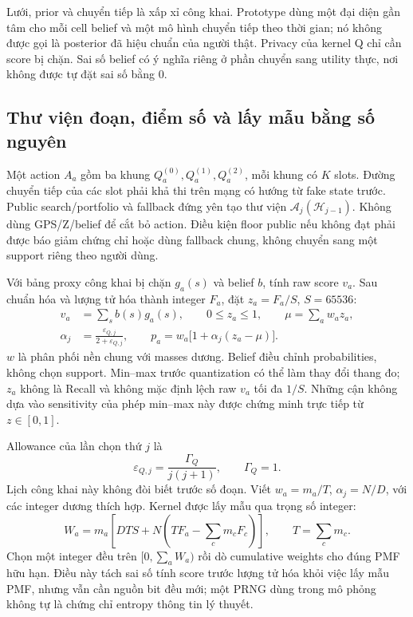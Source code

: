 Lưới, prior và chuyển tiếp là xấp xỉ công khai. Prototype dùng một đại diện gần tâm cho mỗi cell
belief và một mô hình chuyển tiếp theo thời gian; nó không được gọi là posterior đã hiệu chuẩn của
người thật. Privacy của kernel Q chỉ cần score bị chặn. Sai số belief có ý nghĩa riêng ở phần chuyển
sang utility thực, nơi không được tự đặt sai số bằng 0.

\subsection{Thư viện đoạn, điểm số và lấy mẫu bằng số nguyên}
Một action $A_a$ gồm ba khung $Q_a^{(0)},Q_a^{(1)},Q_a^{(2)}$, mỗi khung có $K$ slots. Đường chuyển
tiếp của các slot phải khả thi trên mạng có hướng từ fake state trước. Public search/portfolio và
fallback đứng yên tạo thư viện $\mathcal A_j(\mathcal H_{j-1})$. Không dùng GPS/Z/belief để cắt bỏ
action. Điều kiện floor public nếu không đạt phải được báo giảm chứng chỉ hoặc dùng fallback chung,
không chuyển sang một support riêng theo người dùng.

Với bảng proxy công khai bị chặn $g_a(s)$ và belief $b$, tính raw score $v_a$. Sau chuẩn hóa và
lượng tử hóa thành integer $F_a$, đặt $z_a=F_a/S$, $S=65536$:
\begin{align}
v_a&=\sum_s b(s)g_a(s),\qquad 0\le z_a\le1,\qquad \mu=\sum_a w_a z_a,\nonumber\\
\alpha_j&=\frac{\varepsilon_{Q,j}}{2+\varepsilon_{Q,j}},\qquad
p_a=w_a\bigl[1+\alpha_j(z_a-\mu)\bigr].\label{eq:kernel}
\end{align}
$w$ là phân phối nền chung với masses dương. Belief điều chỉnh probabilities, không chọn support.
Min--max trước quantization có thể làm thay đổi thang đo; $z_a$ không là Recall và không mặc định
lệch raw $v_a$ tối đa $1/S$. Những cận không dựa vào sensitivity của phép min--max này được chứng
minh trực tiếp từ $z\in[0,1]$.

Allowance của lần chọn thứ $j$ là
\begin{equation}
\varepsilon_{Q,j}=\frac{\Gamma_Q}{j(j+1)},\qquad\Gamma_Q=1.
\label{eq:q-allowance}
\end{equation}
Lịch công khai này không đòi biết trước số đoạn. Viết $w_a=m_a/T$, $\alpha_j=N/D$, với các integer
dương thích hợp. Kernel được lấy mẫu qua trọng số integer:
\begin{equation}
W_a=m_a\left[DTS+N\left(TF_a-\sum_c m_cF_c\right)\right],\qquad T=\sum_c m_c.
\label{eq:integer-kernel}
\end{equation}
Chọn một integer đều trên $[0,\sum_aW_a)$ rồi dò cumulative weights cho đúng PMF hữu hạn.
Điều này tách sai số tính score trước lượng tử hóa khỏi việc lấy mẫu PMF, nhưng vẫn cần nguồn bit
đều mới; một PRNG dùng trong mô phỏng không tự là chứng chỉ entropy thông tin lý thuyết.

